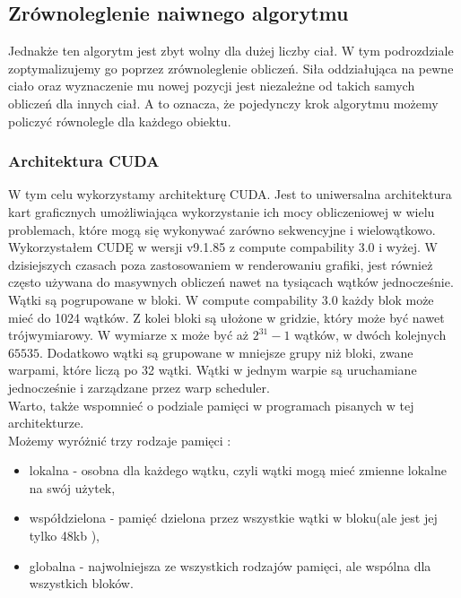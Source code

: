 \documentclass[14pt,twoside,a4paper]{article}
\begin{document}
\bigskip

\subsection{\Large Zrównoleglenie naiwnego algorytmu}

Jednakże ten algorytm jest zbyt wolny dla dużej liczby ciał. W tym podrozdziale zoptymalizujemy go poprzez zrównoleglenie obliczeń. Siła oddziałująca na pewne ciało oraz wyznaczenie mu nowej pozycji jest niezależne od takich samych obliczeń dla innych ciał. A to oznacza, że pojedynczy krok algorytmu możemy policzyć równolegle dla każdego obiektu.

\subsubsection{\large Architektura CUDA}
W tym celu wykorzystamy architekturę CUDA. 
Jest to uniwersalna architektura kart graficznych umożliwiająca wykorzystanie ich mocy obliczeniowej w wielu problemach, które mogą się wykonywać zarówno sekwencyjne i wielowątkowo. Wykorzystałem CUDĘ w wersji v9.1.85 z compute compability 3.0 i wyżej. W dzisiejszych czasach poza zastosowaniem w renderowaniu grafiki, jest również często używana do masywnych obliczeń nawet na tysiącach wątków jednocześnie. \\
Wątki są pogrupowane w bloki. W compute compability 3.0 każdy blok może mieć do 1024 wątków. Z kolei bloki są ułożone w gridzie, który może być nawet trójwymiarowy. W wymiarze x może być aż $2^{31}-1$ wątków, w dwóch kolejnych $65535$. \cite{Cuda} Dodatkowo wątki są grupowane w mniejsze grupy niż bloki, zwane warpami, które liczą po 32 wątki. Wątki w jednym warpie są uruchamiane jednocześnie i zarządzane przez warp scheduler. \cite{Cuda} \\
\bigskip
Warto, także wspomnieć o podziale pamięci w programach pisanych w tej architekturze. \\Możemy wyróżnić trzy rodzaje pamięci :
\begin{itemize}
  \item lokalna - osobna dla każdego wątku, czyli wątki mogą mieć zmienne lokalne na swój użytek,
  \item współdzielona - pamięć dzielona przez wszystkie wątki w bloku(ale jest jej tylko 48kb \cite{Cuda}),
  \item globalna - najwolniejsza ze wszystkich rodzajów pamięci, ale wspólna dla wszystkich bloków.
\end{itemize}
\end{document}
